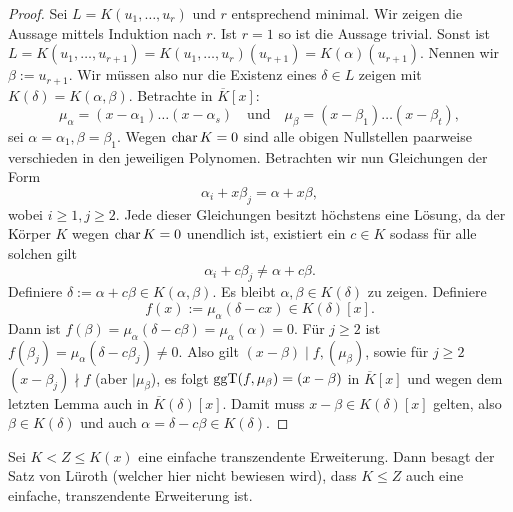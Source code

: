 \begin{proof}
    Sei $L = K(u_1, \hdots, u_r)$ und $r$ entsprechend minimal. Wir zeigen die Aussage mittels Induktion nach $r$. Ist $r = 1$ so ist die Aussage trivial. Sonst ist $L = K(u_1, \hdots, u_{r+1}) = K(u_1, \hdots, u_r)(u_{r+1}) = K(\alpha)(u_{r+1})$. Nennen wir $\beta := u_{r+1}$. Wir müssen also nur die Existenz eines $\delta \in L$ zeigen mit $K(\delta) = K(\alpha, \beta)$. Betrachte in $\overline{K}[x]$:
    $$ \mu_\alpha = (x - \alpha_1) \hdots (x - \alpha_s) \quad \mathrm{und}\quad
     \mu_\beta = (x - \beta_1) \hdots (x - \beta_t), $$ \obda sei $\alpha = \alpha_1, \beta = \beta_1$. Wegen $\operatorname{char} K = 0$ sind alle obigen Nullstellen paarweise verschieden in den jeweiligen Polynomen. Betrachten wir nun Gleichungen der Form
    $$ \alpha_i + x \beta_j = \alpha + x \beta, $$
    wobei $i \geq 1, j \geq 2$. Jede dieser Gleichungen besitzt höchstens eine Lösung, da der Körper $K$ wegen $\operatorname{char} K=0$ unendlich ist, existiert ein $c \in K$ sodass für alle solchen gilt $$ \alpha_i + c \beta_j \neq \alpha + c \beta. $$
    Definiere $\delta := \alpha + c \beta \in K(\alpha, \beta)$. Es bleibt $\alpha, \beta \in K(\delta)$ zu zeigen. Definiere
    $$ f(x) := \mu_\alpha (\delta - cx) \in K(\delta)[x]. $$
    Dann ist $f(\beta) = \mu_\alpha(\delta - c \beta) = \mu_\alpha(\alpha) = 0$. Für $j \geq 2$ ist $f(\beta_j) = \mu_\alpha(\delta - c \beta_j) \neq 0$. Also gilt $(x - \beta) \mid f, (\mu_\beta)$, sowie für $j \geq 2$ $(x-\beta_j) \nmid f$ (aber $\mid \mu_\beta$), es folgt $\operatorname{ggT}(f,\mu_\beta)=(x-\beta)$ in $\overline{K}[x]$ und wegen dem letzten Lemma auch in $\overline{K}(\delta)[x]$. Damit muss $x-\beta\in K(\delta)[x]$ gelten, also $\beta\in K(\delta)$ und auch $\alpha=\delta-c\beta\in K(\delta)$.
\end{proof}

\begin{remark}
    Sei $K < Z \leq K(x)$ eine einfache transzendente Erweiterung. Dann besagt der Satz von Lüroth (welcher hier nicht bewiesen wird), dass $K \leq Z$ auch eine einfache, transzendente Erweiterung ist.
\end{remark}